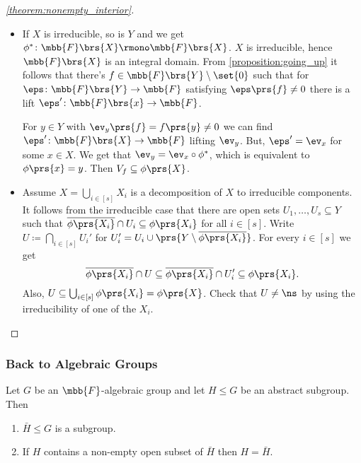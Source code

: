 \documentclass[10pt,a4paper,twoside,openany,hidelinks]{book}
\begin{document}
\begin{proof}[\ref{theorem:nonempty_interior}]
\begin{itemize}
\item If $X$ is irreducible, so is $Y$ and we get $\phi^* \colon \mbb{F}\brs{X} \rmono \mbb{F}\brs{X}$. $X$ is irreducible, hence $\mbb{F}\brs{X}$ is an integral domain. From \ref{proposition:going_up} it follows that there's $f \in \mbb{F}\brs{Y} \setminus \set{0}$ such that for $\eps \colon \mbb{F}\brs{Y} \to \mbb{F}$ satisfying $\eps\prs{f} \neq 0$ there is a lift $\eps' \colon \mbb{F}\brs{x} \to \mbb{F}$.

For $y \in Y$ with $\ev_y\prs{f} = f\prs{y} \neq 0$ we can find $\eps' \colon \mbb{F}\brs{X} \to \mbb{F}$ lifting $\ev_y$. But, $\eps' = \ev_x$ for some $x \in X$. We get that $\ev_y = \ev_x \circ \phi^*$, which is equivalent to $\phi\prs{x} = y$. Then $V_f \subseteq \phi\prs{X}$.

\item Assume $X = \bigcup_{i \in [s]} X_i$ is a decomposition of $X$ to irreducible components. It follows from the irreducible case that there are open sets $U_1, \ldots, U_s \subseteq Y$ such that $\overline{\phi\prs{X_i}} \cap U_i \subseteq \phi\prs{X_i}$ for all $i \in [s]$. Write
$U \coloneqq \bigcap_{i \in [s]} U_i'$ for $U_i' = U_i \cup \prs{Y \setminus \overline{\phi\prs{X_i}}}$. For every $i \in [s]$ we get
\[\overline{\phi\prs{X_i}} \cap U \subseteq \overline{\phi\prs{X_i}} \cap U_i' \subseteq \phi\prs{X_i} \text{.}\]
Also, $U \subseteq \bigcup_{i \in [s]} \phi\prs{X_i} = \phi\prs{X}$.
Check that $U \neq \ns$ by using the irreducibility of one of the $X_i$.
\end{itemize}
\end{proof}

\subsubsection{Back to Algebraic Groups}

\begin{proposition}
Let $G$ be an $\mbb{F}$-algebraic group and let $H \leq G$ be an abstract subgroup. Then
\begin{enumerate}
\item $\bar{H} \leq G$ is a subgroup.
\item If $H$ contains a non-empty open subset of $\bar{H}$ then $H = \bar{H}$.
\end{enumerate}
\end{proposition}
\end{document}
